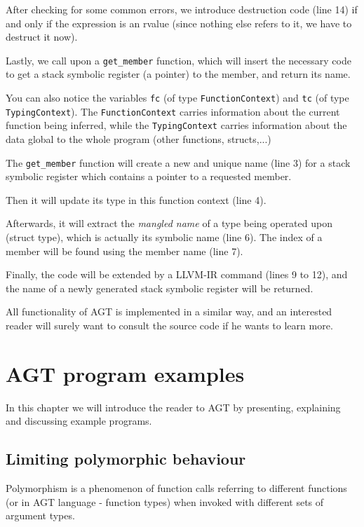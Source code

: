 \documentclass[times, utf8, diplomski]{fer}
\theoremstyle{definition}
\newcommand{\pythoncode}[3]{
    
}
\begin{document}
After checking for some common errors, we introduce destruction code (line 14) if and only if the expression
is an rvalue (since nothing else refers to it, we have to destruct it now).

Lastly, we call upon a \texttt{get\_member} function, which will insert the necessary code
to get a stack symbolic register (a pointer) to the member, and return its name.

You can also notice the variables \texttt{fc} (of type \texttt{FunctionContext}) 
and \texttt{tc} (of type \texttt{TypingContext}).
The \texttt{FunctionContext} carries information about the current function being inferred,
while the \texttt{TypingContext} carries information about the data global to the whole program 
(other functions, structs,...)

\pythoncode{\resdir/compiler/get_mem.py}{getmem}{\texttt{get\_member} function}

The \texttt{get\_member} function will create a new and unique name (line 3) for a
stack symbolic register which contains a pointer to a requested member.

Then it will update its type in this function context (line 4).

Afterwards, it will extract the \textit{mangled name} of a type being operated upon (struct type),
which is actually its symbolic name (line 6). The index of a member will be found
using the member name (line 7).

Finally, the code will be extended by a LLVM-IR command (lines 9 to 12),
and the name of a newly generated stack symbolic register will be returned.

All functionality of AGT is implemented in a similar way, and an interested reader will
surely want to consult the source code if he wants to learn more.

\chapter{AGT program examples}\label{chap:examples}

In this chapter we will introduce the reader to AGT by presenting, explaining and discussing
example programs.

\section{Limiting polymorphic behaviour}

Polymorphism is a phenomenon of function calls referring to different functions 
(or in AGT language - function types) when invoked with different sets of argument types.
\end{document}
